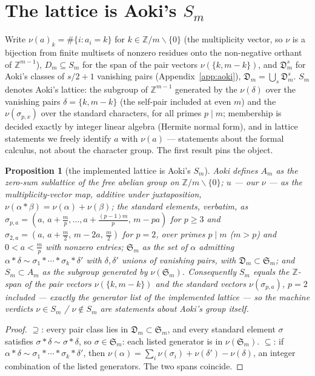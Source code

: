 \documentclass[11pt]{amsart}
\newtheorem{proposition}[theorem]{Proposition}
\theoremstyle{remark}
\newcommand{\Z}{\mathbb{Z}}
\begin{document}
\section{\texorpdfstring{The lattice is Aoki's $S_m$}{The lattice is Aoki's S\_m}}\label{sec:lattice}

Write $\nu(a)_k=\#\{i:a_i=k\}$ for $k\in\Z/m\smallsetminus\{0\}$ (the multiplicity vector,
so $\nu$ is a bijection from finite multisets of nonzero residues onto the non-negative orthant
of $\Z^{m-1}$), $D_m\subseteq S_m$ for the span of the pair vectors $\nu(\{k,m-k\})$, and
$\mathfrak D^s_m$ for Aoki's classes of $s/2+1$ vanishing pairs (Appendix~\ref{app:aoki}),
$\mathfrak D_m=\bigcup_s\mathfrak D^s_m$.
$S_m$ denotes Aoki's lattice: the subgroup of $\Z^{m-1}$ generated by the $\nu(\delta)$ over the
vanishing pairs $\delta=\{k,m-k\}$ (the self-pair included at even $m$) and the
$\nu(\sigma_{p,x})$ over the standard characters, for all primes $p\mid m$; membership is decided
exactly by integer linear algebra (Hermite normal form), and in lattice
statements we freely identify $a$ with $\nu(a)$ --- statements about the formal calculus, not
about the character group. The first result pins the object.

\begin{proposition}[the implemented lattice is Aoki's $S_m$]\label{prop:ident}
Aoki \cite[\S2]{Aoki00} defines $A_m$ as the zero-sum sublattice of the free abelian group on
$\Z/m\smallsetminus\{0\}$; $u$ --- our $\nu$ --- as the multiplicity-vector map, additive
under juxtaposition, $\nu(\alpha*\beta)=\nu(\alpha)+\nu(\beta)$; the standard elements,
verbatim, as
$\sigma_{p,a}=(a,\,a+\frac mp,\dots,a+\frac{(p-1)m}p,\,m-pa)$ for $p\ge3$ and
$\sigma_{2,a}=(a,\,a+\frac m2,\,m-2a,\,\frac m2)$ for $p=2$, over primes $p\mid m$ ($m>p$) and
$0<a<\frac mp$ with nonzero entries; $\mathfrak S_m$ as the set of $\alpha$ admitting
$\alpha*\delta\sim\sigma_1*\cdots*\sigma_k*\delta'$ with $\delta,\delta'$ unions of vanishing
pairs, with $\mathfrak D_m\subset\mathfrak S_m$; and $S_m\subset A_m$ as the subgroup generated
by $\nu(\mathfrak S_m)$. Consequently $S_m$ equals the $\Z$-span of the pair vectors
$\nu(\{k,m-k\})$ and the standard vectors $\nu(\sigma_{p,a})$, $p=2$ included --- exactly the
generator list of the implemented lattice --- so the machine verdicts $\nu\in S_m$ /
$\nu\notin S_m$ are statements about Aoki's group itself.
\end{proposition}
\begin{proof}
$\supseteq$: every pair class lies in $\mathfrak D_m\subset\mathfrak S_m$, and every standard
element $\sigma$ satisfies $\sigma*\delta\sim\sigma*\delta$, so $\sigma\in\mathfrak S_m$: each
listed generator is in $\nu(\mathfrak S_m)$. $\subseteq$: if
$\alpha*\delta\sim\sigma_1*\cdots*\sigma_k*\delta'$, then
$\nu(\alpha)=\sum_i\nu(\sigma_i)+\nu(\delta')-\nu(\delta)$, an integer combination of the listed
generators. The two spans coincide.
\end{proof}
\end{document}
